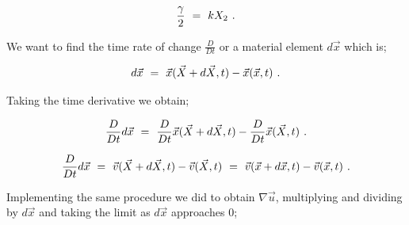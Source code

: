 \documentclass{article}
\newcounter{subsubsubsection}[subsubsection]
\begin{document}
\begin{equation} \label{eq:1}
\frac{\gamma}{2} \hspace{0.125cm} = \hspace{0.125cm} k X_2 \hspace{0.125cm}  . 
\end{equation} 


We want to find the time rate of change \begin{math} \frac{D}{D t} \end{math} or a material element \begin{math} d \vec{x} \end{math} which is;

\begin{equation} \label{eq:1}
d \vec{x} \hspace{0.125cm} = \hspace{0.125cm} \vec{x}(\vec{X} + d \vec{X}, t) - \vec{x}(\vec{x}, t) \hspace{0.125cm}  . 
\end{equation} 

Taking the time derivative we obtain;

\begin{equation} \label{eq:1}
\frac{D}{D t} d \vec{x} \hspace{0.125cm} = \hspace{0.125cm} \frac{D}{D t} \vec{x}(\vec{X} + d \vec{X}, t) - \frac{D}{D t} \vec{x}(\vec{X}, t) \hspace{0.125cm}  . 
\end{equation} 

\begin{equation} \label{eq:1}
\frac{D}{D t} d \vec{x} \hspace{0.125cm} = \hspace{0.125cm} \vec{v}(\vec{X} + d \vec{X}, t) - \vec{v}(\vec{X}, t) \hspace{0.125cm} = \hspace{0.125cm} \vec{v}(\vec{x} + d \vec{x}, t) - \vec{v}(\vec{x}, t) \hspace{0.125cm} . 
\end{equation} 

Implementing the same procedure we did to obtain \begin{math} \nabla{\vec{u}} \end{math}, multiplying and dividing by \begin{math} d \vec{x} \end{math} and taking the limit as \begin{math} d \vec{x} \end{math} approaches \begin{math} 0 \end{math};
\end{document}
